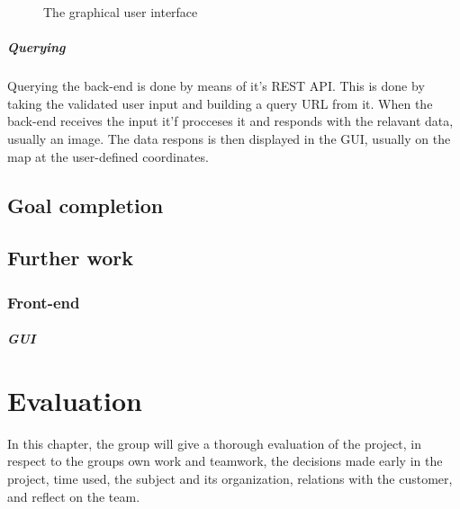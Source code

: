 \documentclass[11pt,a4paper,titlepage,oneside]{report}
\begin{document}
\begin{figure}[H]
\begin{center}
\caption{The graphical user interface}
\label{fig:gui}
\end{center}
\end{figure}

\paragraph{Querying}
Querying the back-end is done by means of it's REST API. This is done by taking the validated user input and building a query URL from it. When the back-end receives the input it'f procceses it and responds with the relavant data, usually an image. The data respons is then displayed in the GUI, usually on the map at the user-defined coordinates. 

\section{Goal completion}
\section{Further work}
\subsection{Front-end}
\paragraph{GUI}

\chapter{Evaluation}
In this chapter, the group will give a thorough evaluation of the project, in respect to the groups own work and teamwork, the decisions made early in the project, time used, the subject and its organization, relations with the customer, and reflect on the team. 
\end{document}
